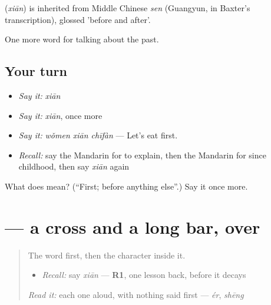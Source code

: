 \begin{cousinweb}
\textbf{} (\emph{xiān}) is inherited from Middle Chinese \emph{sen} (Guangyun, in Baxter's transcription), glossed 'before and after'.
\end{cousinweb}

\begin{grammarlens}[title={What you've built}]
One more word for talking about the past.
\end{grammarlens}

\subsection*{Your turn}
\begin{itemize}
\raggedright
  \item \emph{Say it:} \emph{xiān}
  \item \emph{Say it:} \emph{xiān}, once more
  \item \emph{Say it:} \emph{wǒmen xiān chīfàn} — Let's eat first.
  \item \emph{Recall:} say the Mandarin for to explain, then the Mandarin for since childhood, then say \emph{xiān} again
\end{itemize}

\begin{tcolorbox}[breakable,colback=teal!4,colframe=teal!35!black,title={Before you move on}]
What does  mean? (\textquotedblleft{}First; before anything else\textquotedblright{}.) Say it once more.
\end{tcolorbox}
\section[\texorpdfstring{\zh{先} (xiān)}{先 (xiān)}]{ — a cross and a long bar, over }

\label{lesson:ZH-W269-xian-first}



\begin{quote}
The word first, then the character inside it.

\begin{itemize}
\raggedright
  \item \emph{Recall:} say \emph{xiān} — \textbf{R1}, one lesson back, before it decays
\end{itemize}

\begin{quote}
 
\end{quote}

\emph{Read it:} each one aloud, with nothing said first — \emph{ér}, \emph{shēng}
\end{quote}


